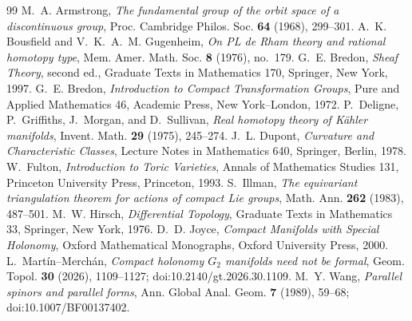\documentclass[11pt]{article}
\theoremstyle{remark}\newtheorem{remark}[theorem]{Remark}
\begin{document}
\begin{thebibliography}{99}
M.~A. Armstrong,
\emph{The fundamental group of the orbit space of a discontinuous group},
Proc. Cambridge Philos. Soc. \textbf{64} (1968), 299--301.
A.~K. Bousfield and V.~K.~A.~M. Gugenheim,
\emph{On PL de Rham theory and rational homotopy type},
Mem. Amer. Math. Soc. \textbf{8} (1976), no.~179.
G.~E. Bredon,
\emph{Sheaf Theory}, second ed., Graduate Texts in Mathematics 170,
Springer, New York, 1997.
G.~E. Bredon,
\emph{Introduction to Compact Transformation Groups}, Pure and Applied
Mathematics 46, Academic Press, New York--London, 1972.
P.~Deligne, P.~Griffiths, J.~Morgan, and D.~Sullivan,
\emph{Real homotopy theory of K\"ahler manifolds},
Invent. Math. \textbf{29} (1975), 245--274.
J.~L. Dupont,
\emph{Curvature and Characteristic Classes}, Lecture Notes in Mathematics
640, Springer, Berlin, 1978.
W.~Fulton,
\emph{Introduction to Toric Varieties}, Annals of Mathematics Studies 131,
Princeton University Press, Princeton, 1993.
S.~Illman,
\emph{The equivariant triangulation theorem for actions of compact Lie
groups}, Math. Ann. \textbf{262} (1983), 487--501.
M.~W. Hirsch,
\emph{Differential Topology}, Graduate Texts in Mathematics 33,
Springer, New York, 1976.
D.~D. Joyce,
\emph{Compact Manifolds with Special Holonomy}, Oxford Mathematical
Monographs, Oxford University Press, 2000.
L.~Mart\'in--Merch\'an,
\emph{Compact holonomy $G_2$ manifolds need not be formal},
Geom. Topol. \textbf{30} (2026), 1109--1127;
doi:10.2140/gt.2026.30.1109.
M.~Y. Wang,
\emph{Parallel spinors and parallel forms},
Ann. Global Anal. Geom. \textbf{7} (1989), 59--68;
doi:10.1007/BF00137402.
\end{thebibliography}
\end{document}
